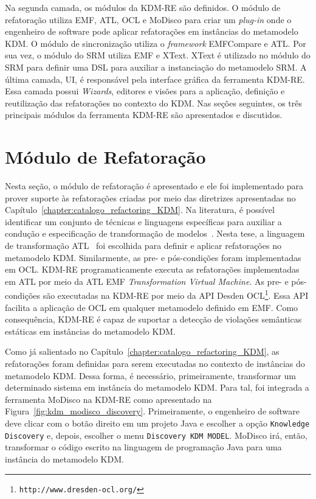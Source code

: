 Na segunda camada, os módulos da KDM-RE são definidos. O módulo de refatoração utiliza EMF, ATL, OCL e MoDisco para criar um \textit{plug-in} onde o engenheiro de software pode aplicar refatorações em instâncias do metamodelo KDM. O módulo de sincronização utiliza o \textit{framework} EMFCompare e ATL. Por sua vez, o módulo do SRM utiliza EMF e XText. XText é utilizado no módulo do SRM para definir uma DSL para auxiliar a instanciação do metamodelo SRM. A última camada, UI, é responsável pela interface gráfica da ferramenta KDM-RE. Essa camada possui \textit{Wizards}, editores e visões para a aplicação, definição e reutilização das refatorações no contexto do KDM. Nas seções seguintes, os três principais módulos da ferramenta KDM-RE são apresentados e discutidos.


\section{Módulo de Refatoração}\label{sec:modulo_de_refatoracao_kdm_re}

Nesta seção, o módulo de refatoração é apresentado e ele foi implementado para prover suporte às refatorações criadas por meio das diretrizes apresentadas no Capítulo~\ref{chapter:catalogo_refactoring_KDM}. Na literatura, é possível identificar um conjunto de técnicas e linguagens específicas para auxiliar a condução e especificação de transformação de modelos~\cite{Biehl_2010, Mens_2006, Allilaire_06}. Nesta tese, a linguagem de transformação ATL~\cite{ATL_eclipse,Jouault_2008} foi escolhida para definir e aplicar refatorações no metamodelo KDM. Similarmente, as pre- e pós-condições foram implementadas em OCL. KDM-RE programaticamente executa as refatorações implementadas em ATL por meio da ATL EMF \textit{Transformation Virtual Machine}. As pre- e pós-condições são executadas na KDM-RE por meio da API Desden OCL\footnote{\texttt{http://www.dresden-ocl.org/}}. Essa API facilita a aplicação de OCL em qualquer metamodelo definido em EMF. Como consequência, KDM-RE é capaz de suportar a detecção de violações semânticas estáticas em instâncias do metamodelo KDM.


Como já salientado no Capítulo~\ref{chapter:catalogo_refactoring_KDM}, as refatorações foram definidas para serem executadas no contexto de instâncias do metamodelo KDM. Dessa forma, é necessário, primeiramente, transformar um determinado sistema em instância do metamodelo KDM. Para tal, foi integrada a ferramenta MoDisco na KDM-RE como apresentado na Figura~\ref{fig:kdm_modisco_discovery}. Primeiramente, o engenheiro de software deve clicar com o botão direito em um projeto Java e escolher a opção \texttt{Knowledge Discovery} e, depois, escolher o menu \texttt{Discovery KDM MODEL}. MoDisco irá, então, transformar o código escrito na linguagem de programação Java para uma instância do metamodelo KDM. 

